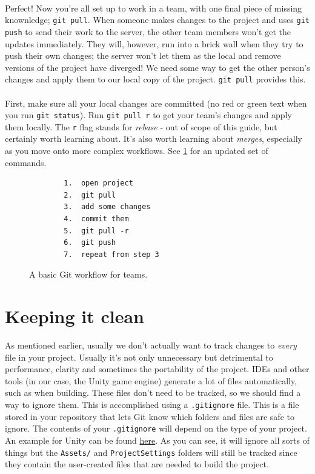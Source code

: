 \documentclass{article}
\begin{document}
\paragraph{}
Perfect! Now you're all set up to work in a team, with one final piece of missing knownledge; \texttt{git pull}. When someone makes changes to the project and uses \texttt{git push} to send their work to the server, the other team members won't get the updates immediately. They will, however, run into a brick wall when they try to push their own changes; the server won't let them as the local and remove versions of the project have diverged! We need some way to get the other person's changes and apply them to our local copy of the project. \texttt{git pull} provides this.

\paragraph{}
First, make sure all your local changes are committed (no red or green text when you run \texttt{git status}). Run \texttt{git pull \-r} to get your team's changes and apply them locally. The \texttt{\-r} flag stands for \textit{rebase} - out of scope of this guide, but certainly worth learning about. It's also worth learning about \textit{merges}, especially as you move onto more complex workflows. See \ref{fig:rebase-workflow} for an updated set of commands.

\begin{figure}
    \begin{lstlisting}
        1.  open project
        2.  git pull
        3.  add some changes
        4.  commit them
        5.  git pull -r
        6.  git push
        7.  repeat from step 3
    \end{lstlisting}
    \caption{A basic Git workflow for teams.}
    \label{fig:rebase-workflow}
\end{figure}

\section{Keeping it clean}
As mentioned earlier, usually we don't actually want to track changes to \textit{every} file in your project. Usually it's not only unnecessary but detrimental to performance, clarity and sometimes the portability of the project. IDEs and other tools (in our case, the Unity game engine) generate a lot of files automatically, such as when building. These files don't need to be tracked, so we should find a way to ignore them. This is accomplished using a \texttt{.gitignore} file. This is a file stored in your repository that lets Git know which folders and files are safe to ignore. The contents of your \texttt{.gitignore} will depend on the type of your project. An example for Unity can be found \href{https://github.com/github/gitignore/blob/master/Unity.gitignore}{here}. As you can see, it will ignore all sorts of things but the \texttt{Assets/} and \texttt{ProjectSettings} folders will still be tracked since they contain the user-created files that are needed to build the project.
\end{document}
